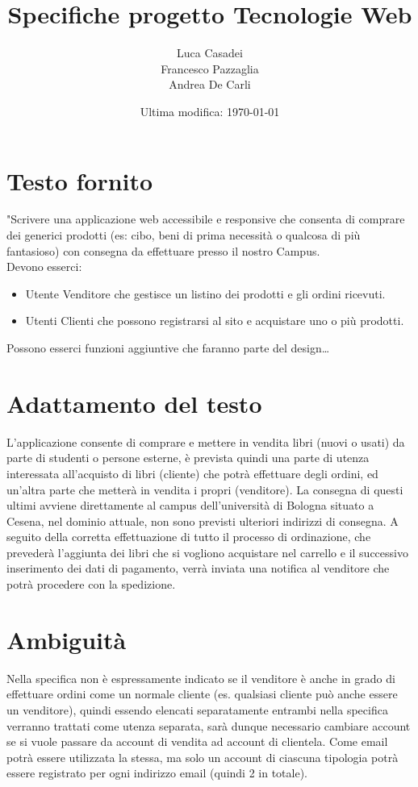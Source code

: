 \documentclass[a4paper]{article}
\author{Luca Casadei\\Francesco Pazzaglia\\Andrea De Carli}
\date{Ultima modifica: \today}
\title{\textbf{Specifiche progetto Tecnologie Web}}
\begin{document}
	\maketitle
	\tableofcontents
	\printnoidxglossaries
	\section{Testo fornito}
	"Scrivere una applicazione web accessibile e responsive che consenta di comprare dei generici prodotti (es:	cibo, beni di prima necessità o qualcosa di più fantasioso) con consegna da effettuare presso il nostro Campus.\\
	Devono esserci:
	\begin{itemize}
		\item Utente Venditore che gestisce un listino dei prodotti e gli ordini ricevuti.
		\item Utenti Clienti che possono registrarsi al sito e acquistare uno o più prodotti.
	\end{itemize}
	Possono esserci funzioni aggiuntive che faranno parte del design\dots\quotedblbase
	\section{Adattamento del testo}
	L'applicazione consente di comprare e mettere in vendita libri (nuovi o usati) da parte di studenti o persone esterne, è prevista quindi una parte di utenza interessata all'acquisto di libri (\gls{cliente}) che potrà effettuare degli ordini, ed un'altra parte che metterà in vendita i propri (\gls{venditore}). La consegna di questi ultimi avviene direttamente al \Gls{campus} dell'università di Bologna situato a Cesena, nel dominio attuale, non sono previsti ulteriori indirizzi di consegna. A seguito della corretta effettuazione di tutto il processo di ordinazione, che prevederà l'aggiunta dei libri che si vogliono acquistare nel carrello e il successivo inserimento dei dati di pagamento, verrà inviata una notifica al venditore che potrà procedere con la spedizione.
	\section{Ambiguità}
	Nella specifica non è espressamente indicato se il venditore è anche in grado di effettuare ordini come un normale cliente (es. qualsiasi cliente può anche essere un venditore), quindi essendo elencati separatamente entrambi nella specifica verranno trattati come utenza separata, sarà dunque necessario cambiare account se si vuole passare da account di vendita ad account di clientela. Come email potrà essere utilizzata la stessa, ma solo un account di ciascuna tipologia potrà essere registrato per ogni indirizzo email (quindi 2 in totale).
\end{document}
